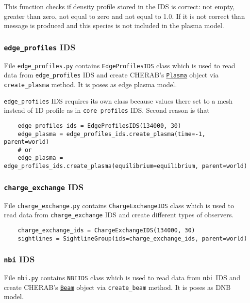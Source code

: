 \documentclass[../main.tex]{subfiles}
\begin{document}
This function checks if density profile stored in the IDS is correct: not empty, greater than zero, not equal to zero and not equal to 1.0. If it is not correct than message is produced and this species is not included in the plasma model.

\subsubsection{\texttt{edge\_profiles} IDS}%
\label{sec:edge_profiles_ids}

File \texttt{edge\_profiles.py} contains \texttt{EdgeProfilesIDS} class which is used to read data from \texttt{edge\_profiles} IDS and create CHERAB's \href{https://cherab.github.io/documentation/plasmas/core_plasma_classes.html?highlight=plasma#cherab.core.Plasma}{\texttt{Plasma}} object via \texttt{create\_plasma} method. It is poses as edge plasma model.

\texttt{edge\_profiles} IDS requires its own class because values there set to a mesh instead of 1D profile as in \texttt{core\_profiles} IDS. Second reason is that

\begin{verbatim}
    edge_profiles_ids = EdgeProfilesIDS(134000, 30)
    edge_plasma = edge_profiles_ids.create_plasma(time=-1, parent=world)
    # or
    edge_plasma = edge_profiles_ids.create_plasma(equilibrium=equilibrium, parent=world)
\end{verbatim}

\subsubsection{\texttt{charge\_exchange} IDS}%
\label{sec:charge_exchange_ids}

File \texttt{charge\_exchange.py} contains \texttt{ChargeExchangeIDS} class which is used to read data from \texttt{charge\_exchange} IDS and create different types of observers.

\begin{verbatim}
    charge_exchange_ids = ChargeExchangeIDS(134000, 30)
    sightlines = SightlineGroup(ids=charge_exchange_ids, parent=world)
\end{verbatim}

\subsubsection{\texttt{nbi} IDS}%
\label{sec:nbi_ids}

File \texttt{nbi.py} contains \texttt{NBIIDS} class which is used to read data from \texttt{nbi} IDS and create CHERAB's \href{https://cherab.github.io/documentation/plasmas/particle_beams.html?highlight=beam#cherab.core.Beam}{\texttt{Beam}} object via \texttt{create\_beam} method. It is poses as DNB model.
\end{document}
